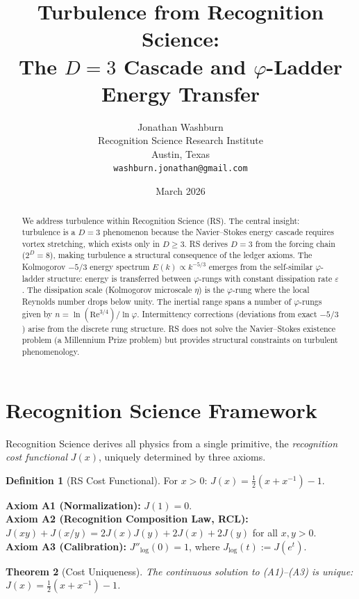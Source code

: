 \documentclass[12pt,a4paper]{article}
\title{Turbulence from Recognition Science:\\
The $D = 3$ Cascade and $\varphi$-Ladder Energy Transfer}
\author{Jonathan Washburn\\
Recognition Science Research Institute\\
Austin, Texas\\
\texttt{washburn.jonathan@gmail.com}}
\date{March 2026}
\newtheorem{theorem}{Theorem}[section]
\theoremstyle{definition}
\newtheorem{definition}[theorem]{Definition}
\theoremstyle{remark}
\begin{document}
\maketitle

\begin{abstract}
We address turbulence within Recognition Science (RS).  The
central insight: turbulence is a $D = 3$ phenomenon because the
Navier--Stokes energy cascade requires vortex stretching, which
exists only in $D \geq 3$.  RS derives $D = 3$ from the forcing
chain ($2^D = 8$), making turbulence a structural consequence of
the ledger axioms.  The Kolmogorov $-5/3$ energy spectrum
$E(k) \propto k^{-5/3}$ emerges from the self-similar
$\varphi$-ladder structure: energy is transferred between
$\varphi$-rungs with constant dissipation rate $\varepsilon$.  The
dissipation scale (Kolmogorov microscale $\eta$) is the
$\varphi$-rung where the local Reynolds number drops below unity.
The inertial range spans a number of $\varphi$-rungs given by
$n = \ln(\mathrm{Re}^{3/4})/\ln\varphi$.  Intermittency
corrections (deviations from exact $-5/3$) arise from the discrete
rung structure.  RS does not solve the Navier--Stokes existence
problem (a Millennium Prize problem) but provides structural
constraints on turbulent phenomenology.
\end{abstract}

\section{Recognition Science Framework}
\label{sec:framework}

Recognition Science derives all physics from a single primitive,
the \emph{recognition cost functional} $J(x)$, uniquely determined
by three axioms.

\begin{definition}[RS Cost Functional]
For $x > 0$: $J(x) = \tfrac{1}{2}(x + x^{-1}) - 1$.
\end{definition}

\noindent\textbf{Axiom A1 (Normalization):} $J(1) = 0$.\\
\textbf{Axiom A2 (Recognition Composition Law, RCL):}
$J(xy) + J(x/y) = 2J(x)J(y) + 2J(x) + 2J(y)$ for all $x, y > 0$.\\
\textbf{Axiom A3 (Calibration):} $J''_{\log}(0) = 1$, where
$J_{\log}(t) := J(e^t)$.

\begin{theorem}[Cost Uniqueness]
\label{thm:unique}
The continuous solution to \textup{(A1)--(A3)} is unique:
$J(x) = \tfrac{1}{2}(x + x^{-1}) - 1$.
\end{theorem}
\end{document}
